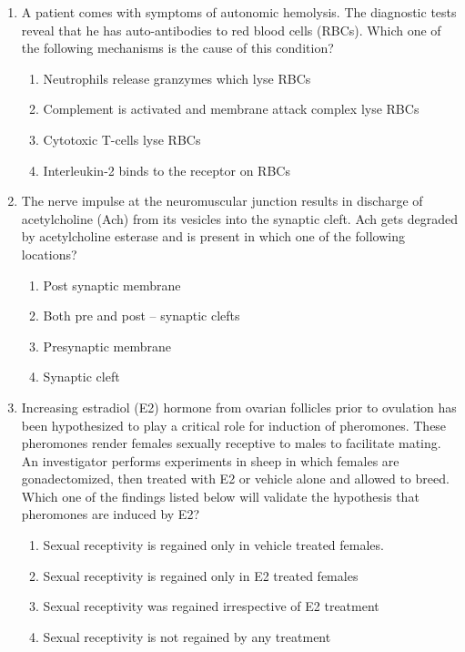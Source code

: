 \documentclass[journal,12pt,onecolumn]{IEEEtran}
\begin{document}
\begin{enumerate}[label=\arabic*.]
\item A patient comes with symptoms of autonomic hemolysis. The diagnostic tests reveal that he has auto-antibodies to red blood cells (RBCs). Which one of the following mechanisms is the cause of this condition?
\begin{enumerate}[label=(\Alph*)]
\item Neutrophils release granzymes which lyse RBCs
\item Complement is activated and membrane attack complex lyse RBCs
\item Cytotoxic T-cells lyse RBCs
\item Interleukin-2 binds to the receptor on RBCs
\end{enumerate}

\item The nerve impulse at the neuromuscular junction results in discharge of acetylcholine (Ach) from its vesicles into the synaptic cleft. Ach gets degraded by acetylcholine esterase and is present in which one of the following locations?
\begin{multicols}{2}
\begin{enumerate}[label=(\Alph*)]
\item Post synaptic membrane
\item Both pre and post – synaptic clefts
\item Presynaptic membrane
\item Synaptic cleft
\end{enumerate}
\end{multicols}

\item Increasing estradiol (E2) hormone from ovarian follicles prior to ovulation has been hypothesized to play a critical role for induction of pheromones. These pheromones render females sexually receptive to males to facilitate mating. An investigator performs experiments in sheep in which females are gonadectomized, then treated with E2 or vehicle alone and allowed to breed. Which one of the findings listed below will validate the hypothesis that pheromones are induced by E2?
\begin{enumerate}[label=(\Alph*)]
\item Sexual receptivity is regained only in vehicle treated females.
\item Sexual receptivity is regained only in E2 treated females
\item Sexual receptivity was regained irrespective of E2 treatment
\item Sexual receptivity is not regained by any treatment
\end{enumerate}

\end{enumerate}
\end{document}
